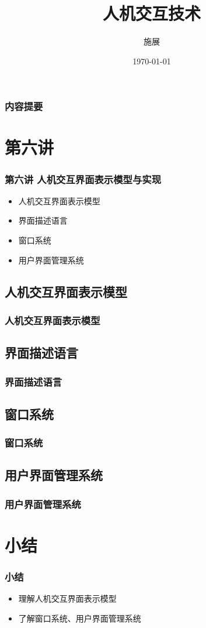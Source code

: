\documentclass{beamer}
\title{人机交互技术}
\author{施展}
\institute{华中科技大学~武汉光电国家实验室}
\date{\today}
\begin{document}
\begin{frame}
	\titlepage
\end{frame}

\begin{frame}
	\frametitle{内容提要}
	\tableofcontents
\end{frame}

\section{第六讲}
\begin{frame}
	\frametitle{第六讲 人机交互界面表示模型与实现}
	\begin{itemize}
		\item 人机交互界面表示模型
		\item 界面描述语言
		\item 窗口系统
		\item 用户界面管理系统
	\end{itemize}
\end{frame}

\subsection{人机交互界面表示模型}
\begin{frame}
	\frametitle{人机交互界面表示模型}

\end{frame}

\subsection{界面描述语言}
\begin{frame}
	\frametitle{界面描述语言}

\end{frame}

\subsection{窗口系统}
\begin{frame}
	\frametitle{窗口系统}

\end{frame}

\subsection{用户界面管理系统}
\begin{frame}
	\frametitle{用户界面管理系统}

\end{frame}

\section{小结}
\begin{frame}
	\frametitle{小结}
	\begin{itemize}
		\item 理解人机交互界面表示模型
		\item 了解窗口系统、用户界面管理系统
	\end{itemize}
\end{frame}
\end{document}
